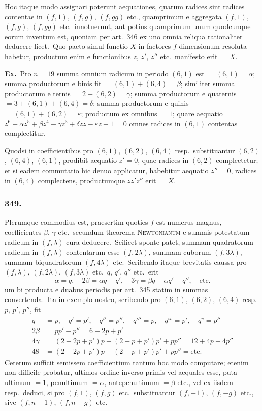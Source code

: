 \documentclass[12pt,a4paper]{article}
\theoremstyle{plain}
\theoremstyle{definition}
\theoremstyle{remark}
\begin{document}
Hoc itaque modo assignari poterunt aequationes, quarum radices sint
radices contentae in $(f,1)$, $(f,g)$, $(f,gg)$ etc., quamprimum e aggregata
$(f,1)$, $(f,g)$, $(f,gg)$ etc.\ innotuerunt, aut potius quamprimum unum
quodcunque eorum inventum est, quoniam per art.\ 346 ex uno omnia
reliqua rationaliter deducere licet.\ Quo pacto simul functio $X$ in
factores $f$ dimensionum resoluta habetur, productum enim e functionibus
$z$, $z'$, $z''$ etc.\ manifesto erit $=X$.

\textbf{Ex.}\ Pro $n=19$ summa omnium radicum in periodo $(6,1)$
est $=(6,1)=\alpha$; summa productorum e binis fit $=(6,1)+(6,4)=\beta$;
similiter summa productorum e ternis $=2+(6,2)=\gamma$; summa
productorum e quaternis $=3+(6,1)+(6,4)=\delta$; summa productorum
e quinis $=(6,1)+(6,2)=\varepsilon$; productum ex omnibus $=1$; quare
aequatio $z^6-\alpha z^5+\beta z^4-\gamma z^3+\delta zz-\varepsilon z+1=0$
omnes radices in $(6,1)$ contentas complectitur.

Quodsi in coefficientibus pro $(6,1)$, $(6,2)$, $(6,4)$ resp.\ substituantur
$(6,2)$, $(6,4)$, $(6,1)$, prodibit aequatio $z'=0$, quae radices in $(6,2)$
complectetur; et si eadem commutatio hic denuo applicatur, habebitur
aequatio $z''=0$, radices in $(6,4)$ complectens, productumque $zz'z''$
erit $=X$.

\subsubsection*{349.}

Plerumque commodius est, praesertim quoties $f$ est numerus magnus,
coefficientes $\beta$, $\gamma$ etc.\ secundum theorema \textsc{Newtonianum} e summis
potestatum radicum in $(f,\lambda)$ cura deducere.\ Scilicet sponte patet,
summam quadratorum radicum in $(f,\lambda)$ contentarum esse $(f,2\lambda)$,
summam cuborum $(f,3\lambda)$, summam biquadratorum $(f,4\lambda)$ etc.\ Scribendo
itaque brevitatis caussa pro $(f,\lambda)$, $(f,2\lambda)$, $(f,3\lambda)$ etc.\ $q$, $q'$,
$q''$ etc.\ erit
\[\alpha=q,\quad 2\beta=\alpha q-q',\quad 3\gamma=\beta q-\alpha q'+q'',\quad\text{etc.}\]
um bi producta e duabus periodis per art.\ 345 statim in summas
convertenda.\ Ita in exemplo nostro, scribendo pro $(6,1)$, $(6,2)$,
$(6,4)$ resp.\ $p$, $p'$, $p''$, fit
\begin{align*}
q &= p,\quad q'=p',\quad q''=p'',\quad q'''=p,\quad q^{iv}=p',\quad q^v=p'' \\
2\beta &= pp'-p'' = 6+2p+p' \\
4\gamma &= (2+2p+p')p-(2+p+p')p'+pp'' = 12+4p+4p'' \\
48 &= (2+2p+p')p-(2+p+p')p'+pp'' = \text{etc.}
\end{align*}
Ceterum sufficit semissem coefficientium tantum hoc modo computare;
etenim non difficile probatur, ultimos ordine inverso primis vel aequales
esse, puta ultimum $=1$, penultimum $=\alpha$, antepenultimum $=\beta$
etc., vel ex iisdem resp.\ deduci, si pro $(f,1)$, $(f,g)$ etc.\ substituantur
$(f,-1)$, $(f,-g)$ etc., sive $(f,n-1)$, $(f,n-g)$ etc.
\end{document}
